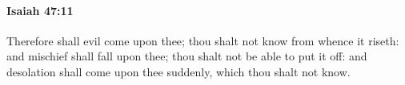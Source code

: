 
		\paragraph{Isaiah 47:11} %
			\label{ISAIAH-47-11}

			Therefore shall evil come upon thee; thou shalt not know from whence it riseth: and mischief shall fall upon thee; thou shalt not be able to put it off: and desolation shall come upon thee suddenly, which thou shalt not know.


